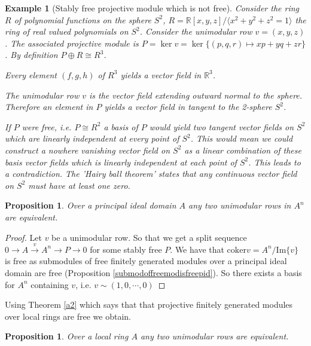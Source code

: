 \documentclass[12pt]{report}
\numberwithin{equation}{section}
\newcommand{\R}{\mathbb{R}}
\newcommand{\image}{{\mathrm{Im}}}
\newcommand{\coker}{{\mathrm{coker}}}
\newcounter{dummy} \numberwithin{dummy}{section}
\newtheorem{proposition}[dummy]{Proposition}
\newtheorem{example}[dummy]{Example}
\begin{document}
	\begin{example}[Stably free projective module which is not free]
		Consider the ring $R$ of polynomial functions on the sphere $S^2$, $R=\mathbb{R}[x,y,z]/\langle x^2+y^2+z^2=1 \rangle$ the ring of real valued polynomials on $S^2$. Consider the unimodular row $v=(x,y,z)$. The associated projective module is $P=\ker v = \ker \{(p,q,r) \mapsto xp+yq+zr\}$. By definition $P \oplus R \cong R^3$. 
		
		Every element $(f, g, h)$ of $R^3$ yields a vector field in $\R^3$.
		
		The unimodular row $v$ is the vector field extending outward normal to the sphere. Therefore an element in $P$ yields a vector field in tangent to the 2-sphere $S^2$. 
		
		If $P$ were free, i.e. $P \cong R^2$ a basis of $P$ would yield two tangent vector fields on $S^2$ which are linearly independent at every point of $S^2$. This would mean we could construct a nowhere vanishing vector field on $S^2$ as a linear combination of these basis vector fields which is linearly independent at each point of $S^2$. This leads to a contradiction. The 'Hairy ball theorem' states that \cite{hairyball} any continuous vector field on $S^2$ must have at least one zero.
	\end{example}
	
	\begin{proposition}\label{inductionbaseforprequillensuslin}
		Over a principal ideal domain $A$ any two unimodular rows in $A^n$ are equivalent.
	\end{proposition}
	\begin{proof}
		Let $v $ be a unimodular row. So that we get a split sequence $0 \to A \xrightarrow{v} A^n \to P \to 0 $ for some stably free $P$. We have that $\coker v = A^n/ \image \{v\} $ is free as submodules of free finitely generated modules over a principal ideal domain are free (Proposition \ref{submodoffreemodisfreepid}). So there exists a basis for $A^n$ containing $v$, i.e. $v \sim (1,0,\cdots,0)$

	\end{proof}
	Using Theorem \ref{a2} which says that that projective finitely generated modules over local rings are free we obtain.
	\begin{proposition}
		Over a local ring $A$ any two unimodular rows are equivalent.
	\end{proposition}
	
\end{document}
